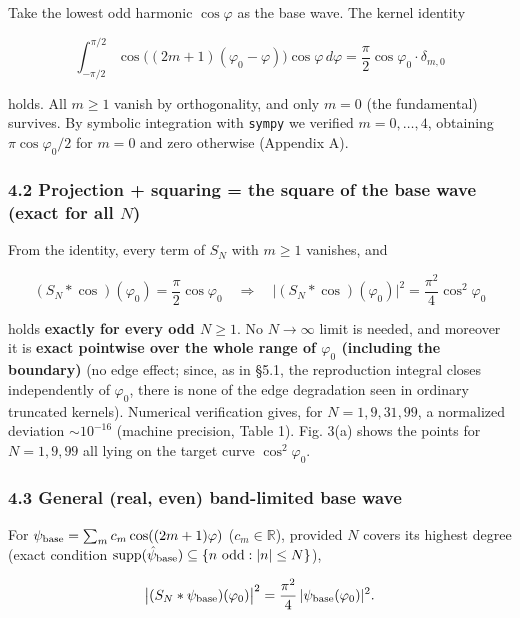 \documentclass[
]{ltjsarticle}
\newcounter{none} %
\begin{document}
Take the lowest odd harmonic \(\cos\varphi\) as the base wave. The
kernel identity

\[
\int_{-\pi/2}^{\pi/2}\cos\big((2m+1)(\varphi_0-\varphi)\big)\cos\varphi\,d\varphi=\frac{\pi}{2}\cos\varphi_0\cdot\delta_{m,0}
\]

holds. All \(m\ge1\) vanish by orthogonality, and only \(m=0\) (the
fundamental) survives. By symbolic integration with \texttt{sympy} we
verified \(m=0,\dots,4\), obtaining \(\pi\cos\varphi_0/2\) for \(m=0\)
and zero otherwise (Appendix A).

\subsubsection{\texorpdfstring{4.2 Projection + squaring = the square of
the base wave (exact for all
\(N\))}{4.2 Projection + squaring = the square of the base wave (exact for all N)}}\label{projection-squaring-the-square-of-the-base-wave-exact-for-all-n}

From the identity, every term of \(S_N\) with \(m\ge1\) vanishes, and

\[
\boxed{\;(S_N*\cos)(\varphi_0)=\frac{\pi}{2}\cos\varphi_0
\quad\Longrightarrow\quad
\big|(S_N*\cos)(\varphi_0)\big|^2=\frac{\pi^2}{4}\cos^2\varphi_0\;}
\]

holds \textbf{exactly for every odd \(N\ge1\)}. No \(N\to\infty\) limit
is needed, and moreover it is \textbf{exact pointwise over the whole
range of \(\varphi_0\) (including the boundary)} (no edge effect; since,
as in §5.1, the reproduction integral closes independently of
\(\varphi_0\), there is none of the edge degradation seen in ordinary
truncated kernels). Numerical verification gives, for \(N=1,9,31,99\), a
normalized deviation \(\sim10^{-16}\) (machine precision, Table 1). Fig.
3(a) shows the points for \(N=1,9,99\) all lying on the target curve
\(\cos^2\varphi_0\).

\subsubsection{4.3 General (real, even) band-limited base
wave}\label{general-real-even-band-limited-base-wave}

For \(\psi_{\rm base}=\sum_m c_m\cos((2m+1)\varphi)\)
(\(c_m\in\mathbb R\)), provided \(N\) covers its highest degree (exact
condition
\(\mathrm{supp}(\hat\psi_{\rm base})\subseteq\{n\ \text{odd}:|n|\le N\}\)),

\[
\big|(S_N*\psi_{\rm base})(\varphi_0)\big|^2=\frac{\pi^2}{4}\,|\psi_{\rm base}(\varphi_0)|^2 .
\]
\end{document}
